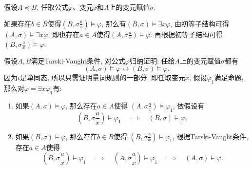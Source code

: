 \documentclass[UTF8]{ctexart}
\begin{document}


假设$A\preccurlyeq B$, 任取公式$\varphi$、变元$x$和$A$上的变元赋值$\sigma$.

\vspace{3pt}
如果存在$b\in B$使得$\displaystyle\left(B,\sigma\frac{b}{x}\right)\models\varphi$,
那么有$(B,\sigma)\models\exists x\varphi$, 由初等子结构可得
$(A,\sigma)\models\exists x\varphi$,
即也存在$a\in A$使得$\displaystyle\left(A,\sigma\frac{a}{x}\right)\models\varphi$.
再根据初等子结构可得$\displaystyle\left(B,\sigma\frac{a}{x}\right)\models\varphi$.


假设$A,B$满足Tarski-Vaught条件, 对公式$\varphi$归纳证明:
任给$A$上的变元赋值$\sigma$都有
\[
    (A,\sigma)\models\varphi\leftrightarrow(B,\sigma)\models\varphi.
\]
因为$\iota$是单同态, 所以只需证明量词规则的一部分.
即任取变元$x$, 假设$\varphi_1$满足命题, 那么对$\varphi=\exists x\varphi_1$有:
\begin{enumerate}
    \item 如果$(A,\sigma)\models\varphi$, 那么存在$a\in A$使得
    $\displaystyle\left(A,\sigma\frac{a}{x}\right)\models\varphi_1$, 依假设有
    \[
        \left(B,\sigma\frac{a}{x}\right)\models\varphi_1
        \quad\implies\quad(B,\sigma)\models\varphi,
    \]
    \item 如果$(B,\sigma)\models\varphi$, 那么存在$b\in B$使得
    $\displaystyle\left(B,\sigma\frac{b}{x}\right)\models\varphi_1$,
    根据Tarski-Vaught条件, 存在$a\in A$使得
    \begin{equation*}
        \left(B,\sigma\frac{a}{x}\right)\models\varphi_1
        \quad\implies\quad\left(A,\sigma\frac{a}{x}\right)\models\varphi_1
        \quad\implies\quad(A,\sigma)\models\varphi.
    \tag*{\qedsymbol}\end{equation*}
\end{enumerate}
\end{document}
